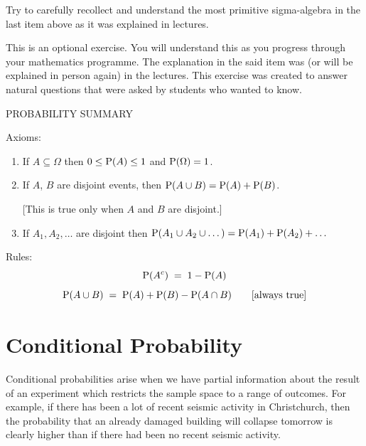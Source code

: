 \ee

\begin{Exercise}[title={Intuiting a most primitive sigma-algebra -- this is optional},label={underMPSA}]
Try to carefully recollect and understand the most primitive sigma-algebra in the last item above as it was explained in lectures.
\end{Exercise}
\begin{Answer}
This is an optional exercise. You will understand this as you progress through your mathematics programme. 
The explanation in the said item was (or will be explained in person again) in the lectures. 
This exercise was created to answer natural questions that were asked by students who wanted to know.
\end{Answer}


\begin{framed}
PROBABILITY SUMMARY

\medskip

Axioms:
\begin{enumerate}
\item If $A\subseteq \Omega$ then $0\leq \P(A)\leq 1$ and $\P(\Omega)=1$.
\item If $A$, $B$ are disjoint events, then $\P(A\cup B)=\P(A)+\P(B)$.

[This is true only when $A$ and $B$ are disjoint.]
\item If $A_1,A_2,\dots$ are disjoint then $\P(A_1\cup A_2
\cup\dots)=\P(A_1)+\P(A_2)+\dots$
\end{enumerate}
Rules:
$$\P(A^c)\;=\;1-\P(A)$$
$$\P(A\cup B)\;=\;\P(A)+\P(B)-\P(A\cap B) \qquad [\textrm{always true}]$$
\end{framed}



\section{Conditional Probability}\label{S:CondProb}

Conditional probabilities arise when we have partial information about
the result of an  experiment which restricts the sample space to a range
of outcomes.  For example, if there has been a lot of recent seismic activity
in Christchurch, then the probability that an already damaged building will
collapse tomorrow is clearly higher than if there had been no recent seismic activity.

